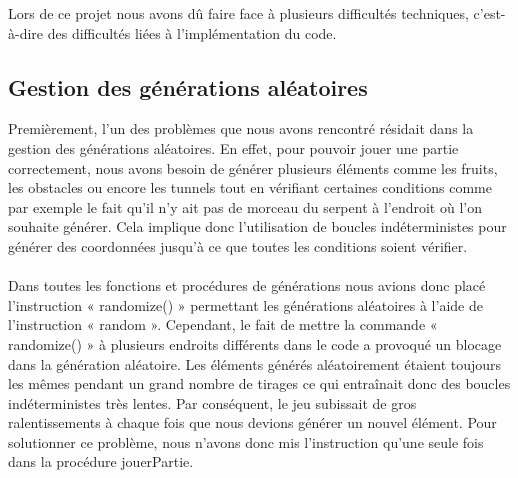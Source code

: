 \documentclass[11pt,a4paper]{article}
\begin{document}
        Lors de ce projet nous avons dû faire face à plusieurs difficultés techniques, c’est-à-dire des difficultés liées à l’implémentation du code.
        
        \subsection{Gestion des générations aléatoires}
        \setlength{\parindent}{1cm}
        Premièrement, l’un des problèmes que nous avons rencontré résidait dans la gestion des générations aléatoires. En effet, pour pouvoir jouer une partie correctement, nous avons besoin de générer plusieurs éléments comme les fruits, les obstacles ou encore les tunnels tout en vérifiant certaines conditions comme par exemple le fait qu’il n’y ait pas de morceau du serpent à l’endroit où l’on souhaite générer. Cela implique donc l’utilisation de boucles indéterministes pour générer des coordonnées jusqu’à ce que toutes les conditions soient vérifier.\\\\
        Dans toutes les fonctions et procédures de générations nous avions donc placé l’instruction « randomize() » permettant les générations aléatoires à l’aide de l’instruction « random ». Cependant, le fait de mettre la commande « randomize() » à plusieurs endroits différents dans le code a provoqué un blocage dans  la génération aléatoire. Les éléments générés aléatoirement étaient toujours les mêmes pendant un grand nombre de tirages ce qui entraînait donc des boucles indéterministes très lentes. Par conséquent, le jeu subissait de gros ralentissements à chaque fois que nous devions générer un nouvel élément. Pour solutionner ce problème, nous n’avons donc mis l’instruction qu’une seule fois dans la procédure jouerPartie.
        
\end{document}
